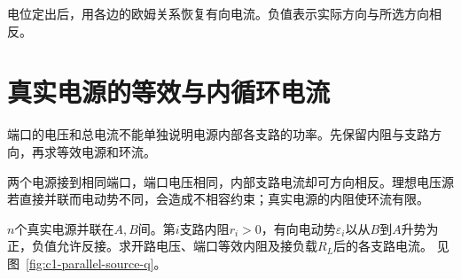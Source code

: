 电位定出后，用各边的欧姆关系恢复有向电流。负值表示实际方向与所选方向相反。


\section{真实电源的等效与内循环电流}
端口的电压和总电流不能单独说明电源内部各支路的功率。先保留内阻与支路方向，再求等效电源和环流。

两个电源接到相同端口，端口电压相同，内部支路电流却可方向相反。理想电压源若直接并联而电动势不同，会造成不相容约束；真实电源的内阻使环流有限。

\begin{example}[多个真实电源的并联等效]\label{ex:c1-parallel-source}
$n$个真实电源并联在$A,B$间。第$i$支路内阻$r_i>0$，有向电动势$\varepsilon_i$以从$B$到$A$升势为正，负值允许反接。求开路电压、端口等效内阻及接负载$R_L$后的各支路电流。 见图~\ref{fig:c1-parallel-source-q}。
\end{example}


